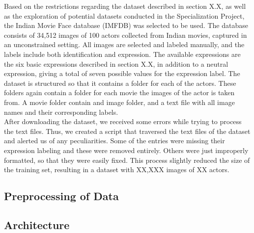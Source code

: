 Based on the restrictions regarding the dataset described in section X.X, as well as the exploration of potential datasets conducted in the Specialization Project, the Indian Movie Face database (IMFDB) was selected to be used. The database consists of 34,512 images of 100 actors collected from Indian movies, captured in an unconstrained setting. All images are selected and labeled manually, and the labels include both identification and expression. The available expressions are the six basic expressions described in section X.X, in addition to a neutral expression, giving a total of seven possible values for the expression label. The dataset is structured so that it contains a folder for each of the actors. These folders again contain a folder for each movie the images of the actor is taken from. A movie folder contain and image folder, and a text file with all image names and their corresponding labels. \\

\noindent After downloading the dataset, we received some errors while trying to process the text files. Thus, we created a script that traversed the text files of the dataset and alerted us of any peculiarities. Some of the entries were missing their expression labeling and these were removed entirely. Others were just improperly formatted, so that they were easily fixed. This process slightly reduced the size of the training set, resulting in a dataset with XX,XXX images of XX actors.


\subsection{Preprocessing of Data}


\subsection{Architecture} %




\cleardoublepage